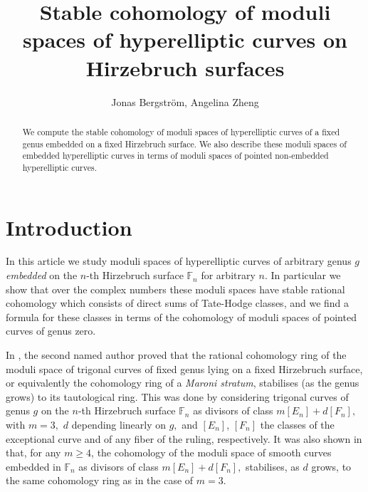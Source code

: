 \documentclass[10pt,a4paper,twoside]{amsart}
\title{Stable cohomology of moduli spaces of hyperelliptic curves on Hirzebruch surfaces}
\author{Jonas Bergstr\"om, Angelina Zheng}
\theoremstyle{plain}
\theoremstyle{definition}
\theoremstyle{remark}
\begin{document}
\begin{abstract}
We compute the stable cohomology of moduli spaces of hyperelliptic curves of a fixed genus embedded on a fixed Hirzebruch surface. We also describe these moduli spaces of embedded hyperelliptic curves in terms of moduli spaces of pointed non-embedded hyperelliptic curves.
\end{abstract}
\maketitle
\section{Introduction}
In this article we study moduli spaces of hyperelliptic curves of arbitrary genus $g$ \emph{embedded} on the $n$-th Hirzebruch surface $\mathbb{F}_n$ for arbitrary $n$. In particular we show that over the complex numbers these moduli spaces have stable rational cohomology which consists of direct sums of Tate-Hodge classes, and we find a formula for these classes in terms of the cohomology of moduli spaces of pointed curves of genus zero. 

In \cite[Proposition 1.1]{Zhe}, the second named author proved that the rational cohomology ring of the moduli space of trigonal curves of fixed genus lying on a fixed Hirzebruch surface, or equivalently the cohomology ring of a \emph{Maroni stratum}, stabilises (as the genus grows) to its tautological ring. This was done by considering trigonal curves of genus $g$ on the $n$-th Hirzebruch surface $\mathbb{F}_n$ as divisors of class $m\left[E_n\right]+d\left[F_n\right],$ with $m=3,$ $d$ depending linearly on $g,$ and $\left[E_n\right]$, $\left[F_n\right]$ the classes of the exceptional curve and of any fiber of the ruling, respectively. It was also shown in \cite[Remark 3.4]{Zhe} that, for any $m\geq4$, the cohomology of the moduli space of smooth curves embedded in $\mathbb{F}_n$ as divisors of class $m[E_n]+d[F_n],$  stabilises, as $d$ grows, to the same cohomology ring as in the case of $m=3$. 
\end{document}
